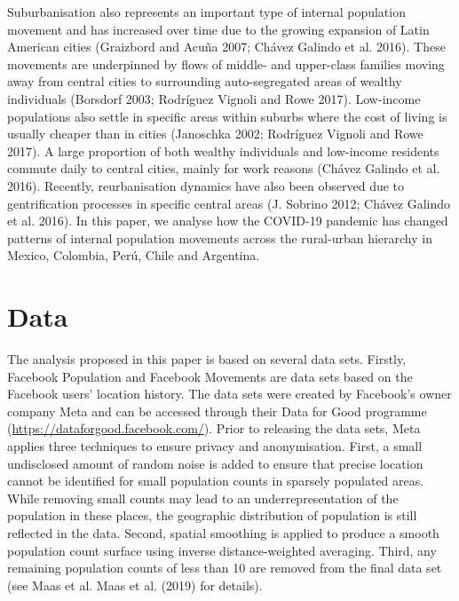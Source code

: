 \documentclass[11pt,letterpaper]{article}
\begin{document}
Suburbanisation also represents an important type of internal population
movement and has increased over time due to the growing expansion of
Latin American cities (Graizbord and Acuña 2007; Chávez Galindo et al.
2016). These movements are underpinned by flows of middle- and
upper-class families moving away from central cities to surrounding
auto-segregated areas of wealthy individuals (Borsdorf 2003; Rodríguez
Vignoli and Rowe 2017). Low-income populations also settle in specific
areas within suburbs where the cost of living is usually cheaper than in
cities (Janoschka 2002; Rodríguez Vignoli and Rowe 2017). A large
proportion of both wealthy individuals and low-income residents commute
daily to central cities, mainly for work reasons (Chávez Galindo et al.
2016). Recently, reurbanisation dynamics have also been observed due to
gentrification processes in specific central areas (J. Sobrino 2012;
Chávez Galindo et al. 2016). In this paper, we analyse how the COVID-19
pandemic has changed patterns of internal population movements across
the rural-urban hierarchy in Mexico, Colombia, Perú, Chile and
Argentina.

\section{Data}

The analysis proposed in this paper is based on several data sets.
Firstly, Facebook Population and Facebook Movements are data sets based
on the Facebook users' location history. The data sets were created by
Facebook's owner company Meta and can be accessed through their Data for
Good programme (\url{https://dataforgood.facebook.com/}). Prior to
releasing the data sets, Meta applies three techniques to ensure privacy
and anonymisation. First, a small undisclosed amount of random noise is
added to ensure that precise location cannot be identified for small
population counts in sparsely populated areas. While removing small
counts may lead to an underrepresentation of the population in these
places, the geographic distribution of population is still reflected in
the data. Second, spatial smoothing is applied to produce a smooth
population count surface using inverse distance-weighted averaging.
Third, any remaining population counts of less than 10 are removed from
the final data set (see Maas et al. Maas et al. (2019) for details).
\end{document}
